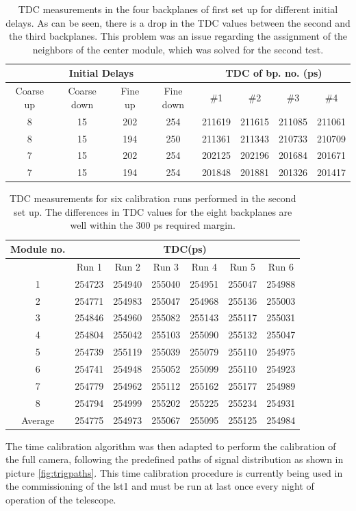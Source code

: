 \documentclass[main.tex]{subfiles}
\begin{document}
\begin{table}
  \centering
  \begin{tabular}{cccccccc}
    \hline
    \multicolumn{4}{c}{Initial Delays} & \multicolumn{4}{c}{TDC of bp. no. (ps)} \\
    \hline
    Coarse up & Coarse down & Fine up & Fine down & \#1 & \#2 & \#3 & \#4 \\
    \hline
    8 & 15 & 202 & 254 & 211619 & 211615 & 211085 & 211061 \\
    8 & 15 & 194 & 250 & 211361 & 211343 & 210733 & 210709 \\
    7 & 15 & 202 & 254 & 202125 & 202196 & 201684 & 201671 \\
    7 & 15 & 194 & 254 & 201848 & 201881 & 201326 & 201417 \\
    \hline
  \end{tabular}
  \caption{TDC measurements in the four backplanes of first set up for different initial delays. As can be seen, there is a drop in the TDC values between the second and the third backplanes. This problem was an issue regarding the assignment of the neighbors of the center module, which was solved for the second test.}
  \label{tab:timecal-test1}
\end{table}

\begin{table}
  \centering
  \begin{tabular}{ccccccc}
    \hline
    \multicolumn{1}{c}{Module no.} & \multicolumn{6}{c}{TDC(ps)} \\
    \hline
    & Run 1 & Run 2 & Run 3 & Run 4 & Run 5 & Run 6 \\
    \hline
    1 & 254723 & 254940 & 255040 & 254951 & 255047 & 254988 \\
    2 & 254771 & 254983 & 255047 & 254968 & 255136 & 255003 \\
    3 & 254846 & 254960 & 255082 & 255143 & 255117 & 255031 \\
    4 & 254804 & 255042 & 255103 & 255090 & 255132 & 255047 \\
    5 & 254739 & 255119 & 255039 & 255079 & 255110 & 254975 \\
    6 & 254741 & 254948 & 255052 & 255099 & 255110 & 254923 \\
    7 & 254779 & 254962 & 255112 & 255162 & 255177 & 254989 \\
    8 & 254794 & 254999 & 255202 & 255225 & 255234 & 254931 \\
    \hline
    Average & 254775 & 254973 & 255067 & 255095 & 255125 & 254984 \\
    \hline
  \end{tabular}
  \caption{TDC measurements for six calibration runs performed in the second set up. The differences in TDC values for the eight backplanes are well within the 300 ps required margin.}
  \label{tab:timecal-test2}
\end{table}

The time calibration algorithm was then adapted to perform the calibration of the full camera, following the predefined paths of signal distribution as shown in picture \ref{fig:trigpaths}. This time calibration procedure is currently being used in the commissioning of the \gls{lst}1 and must be run at last once every night of operation of the telescope.
\end{document}
